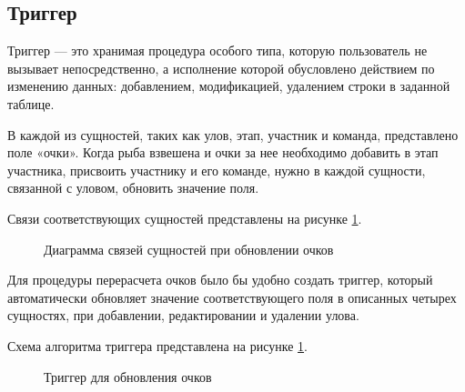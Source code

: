 \subsection{Триггер}
Триггер --- это хранимая процедура особого типа, которую пользователь не вызывает непосредственно, а исполнение которой обусловлено действием по изменению данных: добавлением, модификацией, удалением строки в заданной таблице.  
 
В каждой из сущностей, таких как улов, этап, участник и команда, представлено поле «очки». Когда рыба взвешена и очки за нее необходимо добавить в этап участника, присвоить участнику и его команде, нужно в каждой сущности, связанной с уловом, обновить значение поля. 

Связи соответствующих сущностей представлены на рисунке \ref{fig:score}.

\begin{figure}[ht!]
	\caption{Диаграмма связей сущностей при обновлении очков}
	\label{fig:score}
\end{figure}

Для процедуры перерасчета очков было бы удобно создать триггер, который автоматически обновляет значение соответствующего поля в описанных четырех сущностях, при добавлении, редактировании и удалении улова.  

Схема алгоритма триггера представлена на рисунке \ref{fig:score}.

\begin{figure}[ht!]
	\caption{Триггер для обновления очков}
	\label{fig:trigger}
\end{figure}

